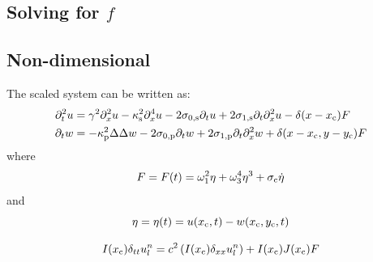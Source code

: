 \subsection{Solving for $f$}


\subsection{Non-dimensional}
The scaled system can be written as:
\begin{align}
    \ptt u &= \gamma^2 \pxx u - \kappa_\stxt^2 \pxxxx u - 2\szX[\stxt]\pt u + 2\soX[\stxt] \pt\pxx u - \delta(x-x_\ctxt)F\\
   \pt w &= -\kappa_\ptxt^2\Delta\Delta w - 2\szX[\ptxt]\pt w + 2\soX[\ptxt] \pt\pxx w + \delta(x-x_\ctxt, y-y_\ctxt)F
\end{align}
where
\begin{equation}
    F = F(t) = \omega_1^2\eta+\omega_3^4\eta^3+\sigma_{\text{c}} \dot\eta
\end{equation}
and
\begin{equation}
    \eta = \eta(t) = u(x_{\text{c}}, t) - w(x_{\text{c}}, y_{\text{c}}, t)
\end{equation}


\begin{equation}
    I(x_{\text{c}})\delta_{tt}u_l^n = c^2
    \left(I(x_{\text{c}})\delta_{xx}u_l^n\right) + I(x_{\text{c}})J(x_{\text{c}})F
\end{equation}